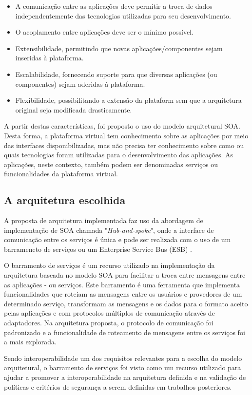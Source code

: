 \begin{itemize}
\item A comunicação entre as aplicações deve permitir a troca de dados independentemente das tecnologias utilizadas para seu desenvolvimento.
\item O acoplamento entre aplicações deve ser o mínimo possível.
\item Extensibilidade, permitindo que novas aplicações/componentes sejam inseridas à plataforma.
\item Escalabilidade, fornecendo suporte para que diversas aplicações (ou componentes) sejam aderidas à plataforma.
\item Flexibilidade,  possibilitando a extensão da plataform sem que a arquitetura original seja modificada drasticamente.
\end{itemize}

A partir destas características, foi proposto o uso do modelo arquitetural SOA. Desta forma, a plataforma virtual tem conhecimento sobre as aplicações por meio das interfaces disponibilizadas, mas não precisa ter conhecimento sobre como ou quais tecnologias foram utilizadas para o desenvolvimento das aplicações. As aplicações, neste contexto, também podem ser denominadas serviços ou funcionalidades da plataforma virtual.

\subsection{A arquitetura escolhida}

A proposta de arquitetura implementada faz uso da abordagem de implementação de SOA chamada "\textit{Hub-and-spoke}", onde a interface de comunicação entre os serviços é única e pode ser realizada com o uso de um barrameneto de serviços ou um Enterprise Service Bus (ESB) \cite{Bianco2007}.

O barramento de serviços é um recurso utilizado na implementação da arquitetura baseada no modelo SOA para facilitar a troca entre mensagens entre as aplicações - ou serviços. Este barramento é uma ferramenta que implementa funcionalidades que roteiam as mensagens entre os usuários e provedores de um determinado serviço, transformam as mensagens e os dados para o formato aceito pelas aplicações e com protocolos múltiplos de comunicação através de adaptadores. Na arquitetura proposta, o protocolo de comunicação foi padronizado e a funcionalidade de roteamento de mensagens entre os serviços foi a mais explorada.

Sendo interoperabilidade um dos requisitos relevantes para a escolha do modelo arquitetural, o barramento de serviços foi visto como um recurso utilizado para ajudar a promover a interoperabilidade na arquitetura definida e na validação de políticas e critérios de segurança a serem definidas em trabalhos posteriores.

